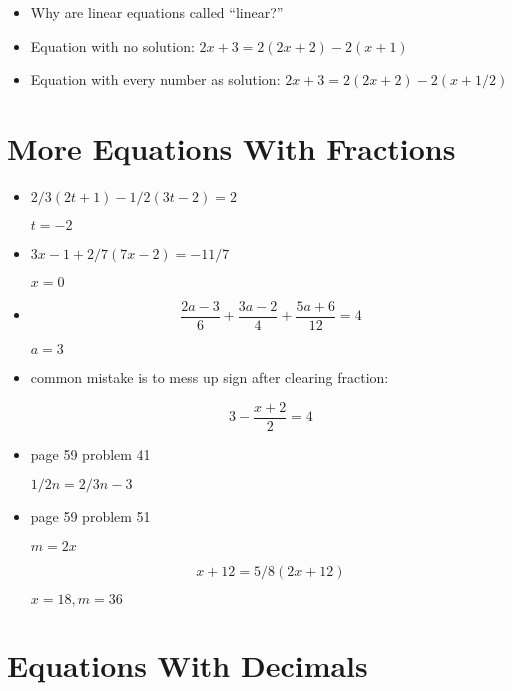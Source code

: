 \documentclass[fleqn]{article}
\begin{document}
\begin{itemize}

\item Why are linear equations called ``linear?''

\item Equation with no solution: \( 2x + 3 = 2(2x + 2) - 2(x + 1) \)

\item Equation with every number as solution: \( 2x + 3 = 2(2x + 2) - 2(x + 1/2) \)

\end{itemize}

\section{More Equations With Fractions}

\begin{itemize}

\item \(2/3(2t + 1) - 1/2(3t - 2) = 2 \)

\( t = -2 \)

\item \( 3x - 1 + 2/7(7x - 2) = -11/7 \)

\(x = 0 \)

\item

\[\frac{2a - 3}{6} + \frac{3a - 2}{4} + \frac{5a + 6}{12} = 4 \]

\( a = 3 \)

\item common mistake is to mess up sign after clearing fraction:

\[ 3 - \frac{x + 2}{2} = 4 \]

\item page 59 problem 41

\(1/2 n = 2/3 n - 3 \)

\item page 59 problem 51

\(m = 2x \)

\[x + 12 = 5/8(2x + 12) \]

\(x = 18, m = 36\)

\end{itemize}

\section{ Equations With Decimals}
\end{document}
